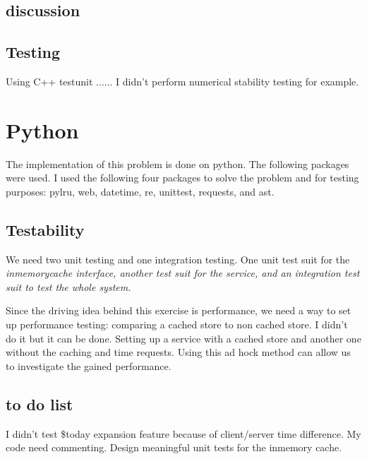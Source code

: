 \documentclass[12pt]{article}
\begin{document}
  \subsection {discussion}
  
  
  \subsection {Testing}
  Using C++ testunit ......
  I didn't perform  numerical stability testing for example.
  
  \section{Python}
  The implementation of this problem is done on python.  The following packages were used.
  I used the following four packages to solve the problem and for testing purposes: {pylru, web, datetime, re, unittest, requests, and ast}. 
  
  \subsection{Testability}
  We need two unit testing and one integration testing.  One unit test suit for the \it{inmemorycache} interface, another test suit for the service, and an integration test suit to test the whole system.
  
  Since the driving idea behind this exercise is performance, we need a way to set up performance testing:  comparing a cached store to non cached store.  I didn't do it but it can be done. 
  Setting up a service with a cached store and another one without the caching and time requests.  Using this ad hock method can allow us to investigate the gained performance.
    
  \subsection{to do list}
   I didn't test \${today} expansion feature because of client/server time difference. 
   My code need commenting.  Design meaningful unit tests for the inmemory cache.
  
  
  
  
\end{document}

